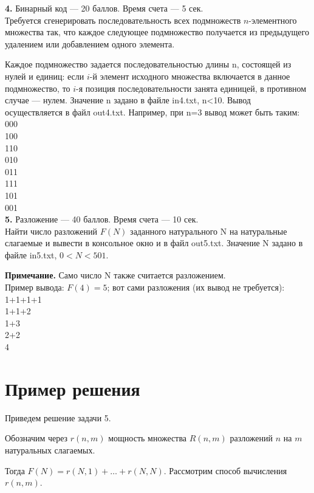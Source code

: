 \textbf{4.} Бинарный код --- 20 баллов. Время счета --- 5 сек.\\
Требуется сгенерировать последовательность всех подмножеств $n$-элементного множества так, что каждое следующее подмножество получается из предыдущего удалением или добавлением одного элемента.

Каждое подмножество задается последовательностью длины n, состоящей из нулей и единиц: если $i$-й элемент исходного множества включается в данное подмножество, то $i$-я позиция последовательности занята единицей, в противном случае --- нулем.
Значение n задано в файле in4.txt, n<10. Вывод осуществляется в файл out4.txt. Например, при n=3 вывод может быть таким:\\
000\\
100\\
110\\
010\\
011\\
111\\
101\\
001\\



\textbf{5.} Разложение --- 40 баллов. Время счета --- 10 сек.\\
Найти число разложений $F(N)$ заданного натурального N на натуральные слагаемые и вывести в консольное окно и в файл out5.txt. Значение N задано в файле in5.txt, $0<N<501$.

\textbf{Примечание.} Само число N также считается разложением.\\
Пример вывода: $F(4)=5$; вот сами разложения (их вывод не требуется):\\
1+1+1+1\\
1+1+2\\
1+3\\
2+2\\
4\\





\section{Пример решения}

Приведем решение задачи 5.

Обозначим через $r(n,m)$ мощность множества $R(n,m)$ разложений $n$ на $m$ натуральных слагаемых.

Тогда $F(N) = r(N,1)+…+r(N,N)$.
Рассмотрим способ вычисления $r(n,m)$.

